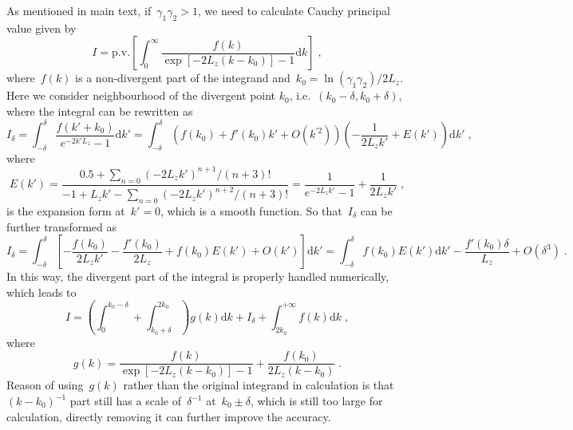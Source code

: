 \documentclass[aps,prl,reprint,showpacs,floatfix,superscriptaddress, onecolumn]{revtex4-2}
\begin{document}
As mentioned in main text, if~$\gamma_1 \gamma_2 > 1$, we need to calculate Cauchy principal value given by
\begin{equation}
    I = \text{p.v.} \left[ \int_0^{\infty} \frac{f(k)}{\exp{\left[-2 L_z (k - k_0)\right]} - 1} \text{d}k \right]\;,
\end{equation}
where~$f(k)$ is a non-divergent part of the integrand and~$k_0 = \ln{(\gamma_1 \gamma_2)} / 2L_z$.
Here we consider neighbourhood of the divergent point $k_0$, i.e.~$\left(k_0 - \delta, k_0 + \delta \right)$, where the integral can be rewritten as
\begin{equation}\label{eq:I_d}
    I_{\delta} = \int_{-\delta}^{\delta} \frac{f(k' + k_0)}{e^{-2k' L_z} - 1} \text{d} k' = \int_{-\delta}^{\delta} \left( f(k_0) + f'(k_0)k' + O(k^{\prime 2}) \right) \left( - \frac{1}{2 L_z k'} + E(k') \right) \text{d} k'\;,
\end{equation}
where
\begin{equation}
    E(k') = \frac{0.5 + \sum_{n = 0} {(-2L_z k')^{n + 1}} / {(n + 3)!}}{-1 + L_zk' - \sum_{n = 0} {(-2 L_z k')^{n + 2}} / {(n + 3)!}} = \frac{1}{e^{-2L_z k'} - 1} + \frac{1}{2 L_z k'}\;,
\end{equation}
is the expansion form at~$k' = 0$, which is a smooth function.
So that~$I_{\delta}$ can be further transformed as
\begin{equation}\label{eq:int_form}
    I_{\delta} = \int_{-\delta}^{\delta} \left[ - \frac{f(k_0)}{2 L_z k'} -  \frac{f'(k_0)}{2 L_z} + f(k_0)E(k') + O(k') \right] \text{d}k' = \int_{-\delta}^{\delta} f(k_0)E(k') \text{d}k' - \frac{f'(k_0) \delta}{L_z} + O(\delta^3)\;.
\end{equation}
In this way, the divergent part of the integral is properly handled numerically, which leads to
\begin{equation}\label{eq:}
    I = \left( \int_0^{k_0 - \delta} + \int_{k_0 + \delta}^{2 k_0} \right) g(k) \text{d} k + I_{\delta} + \int_{2 k_0}^{+\infty} f(k) \text{d} k\;,
\end{equation}
where 
\begin{equation}
    g(k) = \frac{f(k)}{\exp{\left[-2 L_z (k - k_0)\right]} - 1} + \frac{f(k_0)}{2 L_z (k - k_0)}\;.
\end{equation}
Reason of using~$g(k)$ rather than the original integrand in calculation is that~$(k - k_0)^{-1}$ part still has a scale of~$\delta^{-1}$ at~$k_0 \pm \delta$, which is still too large for calculation, directly removing it can further improve the accuracy.
\end{document}
